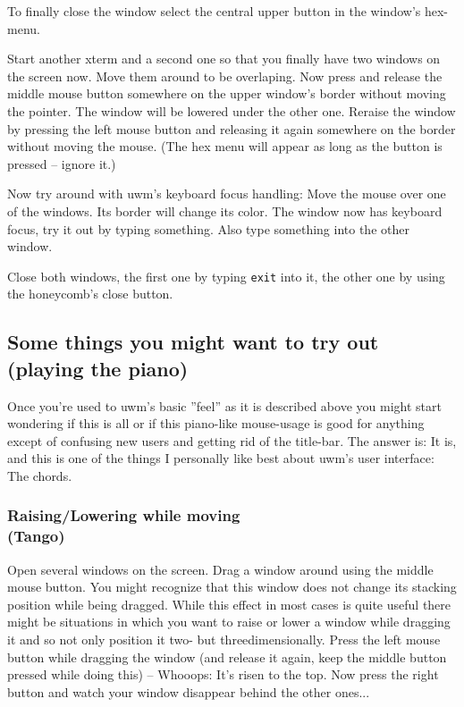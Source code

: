 \documentclass[10pt,a4paper]{article}
\begin{document}
To finally close the window select the central upper button in the window's hex-menu.

Start another xterm and a second one so that you finally have two windows on the screen now. Move them around to be overlaping. Now press and release the middle mouse button somewhere on the upper window's border without moving the pointer. The window will be lowered under the other one. Reraise the window by pressing the left mouse button and releasing it again somewhere on the border without moving the mouse. (The hex menu will appear as long as the button is pressed -- ignore it.)

Now try around with uwm's keyboard focus handling: Move the mouse over one of the windows. Its border will change its color. The window now has keyboard focus, try it out by typing something. Also type something into the other window.

Close both windows, the first one by typing \texttt{exit} into it, the other one by using the honeycomb's close button.

\subsection{Some things you might want to try out\\
\normalsize(playing the piano)}
Once you're used to uwm's basic ''feel'' as it is described above you might start wondering if this is all or if this piano-like mouse-usage is good for anything except of confusing new users and getting rid of the title-bar. The answer is: It is, and this is one of the things I personally like best about uwm's user interface: The chords.

\subsubsection{Raising/Lowering while moving\\\rm(Tango)}

Open several windows on the screen. Drag a window around using the middle mouse button. You might recognize that this window does not change its stacking position while being dragged. While this effect in most cases is quite useful there might be situations in which you want to raise or lower a window while dragging it and so not only position it two- but threedimensionally.
Press the left mouse button while dragging the window (and release it again, keep the middle button pressed while doing this) -- Whooops: It's risen to the top. Now press the right button and watch your window disappear behind the other ones...
\end{document}
